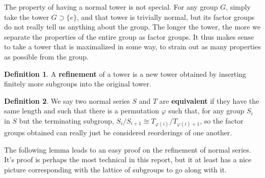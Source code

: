 \documentclass[12pt]{amsbook}
\theoremstyle{definition}
\newtheorem{definition}{Definition}
\begin{document}
The property of having a normal tower is not special. For any group $G$, simply take the tower $G \supset \{e\}$, and that tower is trivially normal, but its factor groups do not really tell us anything about the group. The longer the tower, the more we separate the properties of the entire group as factor groups. It thus makes sense to take a tower that is maximalized in some way, to strain out as many properties as possible from the group.

\begin{definition}
    A {\bf refinement} of a tower is a new tower obtained by inserting finitely more subgroups into the original tower.
\end{definition}

\begin{definition}
    We say two normal series $S$ and $T$ are {\bf equivalent}  if they have the same length and such that there is a permutation $\varphi$ such that, for any group $S_i$ in $S$ but the terminating subgroup, $S_i/S_{i+1} \cong T_{\varphi(i)}/T_{\varphi(i) + 1}$, so the factor groups obtained can really just be considered reorderings of one another.
\end{definition}

The following lemma leads to an easy proof on the refinement of normal series. It's proof is perhaps the most technical in this report, but it at least has a nice picture corresponding with the lattice of subgroups to go along with it.

\begin{center}
\end{center}
\end{document}
